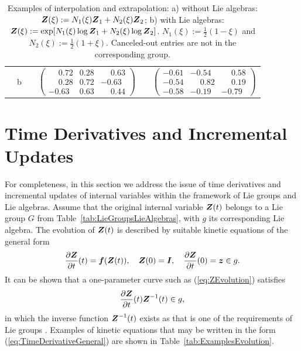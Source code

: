\documentclass[12pt]{article}
\begin{document}
\begin{table}[htbp]
\begin{center}
\begin{tabular}{ c c c c c c}
      &
      \multirow{2}{*}{b}
      &

      &
      \multirow{2}{*}{
        $\left(
          \begin{smallmatrix}
            \phantom{-}0.72 & 0.28 & \phantom{-}0.63\\
            \phantom{-}0.28 & 0.72 & -0.63\\
            -0.63 & 0.63 & \phantom{-}0.44
          \end{smallmatrix}
        \right)$}
      &

      &
      \multirow{2}{*}{
        $\left(
          \begin{smallmatrix}
            -0.61 & -0.54 & \phantom{-}0.58\\
            -0.54 & \phantom{-}0.82 & \phantom{-}0.19\\
            -0.58 & -0.19 & -0.79
          \end{smallmatrix}
        \right)$}
      \\
      \\
      \bottomrule
    \end{tabular}
    \caption{Examples of interpolation and extrapolation: a) without
      Lie algebras: ${\boldsymbol{Z}}(\xi) := N_1(\xi){\boldsymbol{Z}}_1 + N_2(\xi){\boldsymbol{Z}}_2$; b)
      with Lie algebras: ${\boldsymbol{Z}}(\xi) := \exp[N_1(\xi)\log{\boldsymbol{Z}}_1 +
      N_2(\xi)\log{\boldsymbol{Z}}_2]$. $N_1(\xi):=\frac{1}{2}(1-\xi)$ and
      $N_2(\xi):=\frac{1}{2}(1+\xi)$. Canceled-out entries are not in
      the corresponding group.}
    \label{tab:ExamplesInterpolation}
  \end{center}
\end{table}

\section{Time Derivatives and Incremental Updates}
\label{sec:derivatives}

For completeness, in this section we address the issue of time
derivatives and incremental updates of internal variables within the
framework of Lie groups and Lie algebras. Assume that the original
internal variable ${\boldsymbol{Z}}(t)$ belongs to a Lie group $G$ from
Table~\ref{tab:LieGroupsLieAlgebras}, with $g$ its corresponding Lie
algebra. The evolution of ${\boldsymbol{Z}}(t)$ is described by suitable kinetic
equations of the general form
\begin{equation} \label{eq:ZEvolution}
  \frac{\partial {\boldsymbol{Z}}}{\partial t}(t) = {\boldsymbol{f}}({\boldsymbol{Z}}(t)), \quad
  {\boldsymbol{Z}}(0) = {\boldsymbol{I}}, \quad
  \frac{\partial {\boldsymbol{Z}}}{\partial t}(0) = {\boldsymbol{z}} \in g.
\end{equation}
It can be shown that a one-parameter curve such as
(\ref{eq:ZEvolution}) satisfies
\begin{equation} \label{eq:TimeDerivativeGeneral}
  \frac{\partial {\boldsymbol{Z}}}{\partial t}(t) {\boldsymbol{Z}}^{-1}(t) \in g,
\end{equation}
in which the inverse function ${\boldsymbol{Z}}^{-1}(t)$ exists as that is one of
the requirements of Lie groups \citep{Procesi:2006, Sepanski:2007,
  Kosmann-Schwarzbach:2009, Gallier:2011}. Examples of kinetic
equations that may be written in the form
(\ref{eq:TimeDerivativeGeneral}) are shown in
Table~\ref{tab:ExamplesEvolution}.
\end{document}
